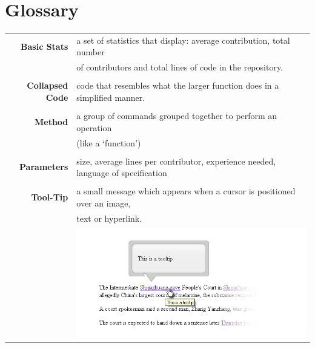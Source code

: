 \documentclass[12pt]{article}
\begin{document}
\part*{Glossary}
\begin{table}[!htb]
\begin{tabular}{rl}
\noindent \textbf{Basic Stats} &  a set of statistics that display: average contribution, total number \\ 
& of contributors and total lines of code in the repository.\\

& \\

\noindent \textbf{Collapsed Code} & code that resembles what the larger function does in a simplified manner.\\

& \\

\noindent \textbf{Method}    & a group of commands grouped together to perform an operation \\
& (like a `function')\\

& \\ 

\noindent \textbf{Parameters}    & size, average lines per contributor, experience needed, language of specification\\

& \\

\noindent \textbf{Tool-Tip} & a small message which appears when a cursor is positioned over an image,\\
                             &  text or hyperlink.\\
                             & \hfill \includegraphics[scale=0.7]{tooltip}\\
\end{tabular}
\end{table}
\end{document}
